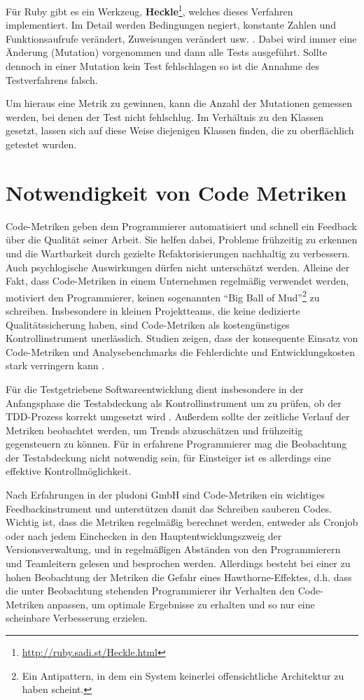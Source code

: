  Für Ruby gibt es ein Werkzeug, \textbf{Heckle}\footnote{\url{http://ruby.sadi.st/Heckle.html}}, welches dieses Verfahren implementiert. Im Detail werden Bedingungen negiert, konstante Zahlen und Funktionsaufrufe verändert, Zuweisungen verändert usw. \citep{ruby_sadists_confessions_2010}. Dabei wird immer eine Änderung (Mutation) vorgenommen und dann alle Tests ausgeführt. Sollte dennoch in einer Mutation kein Test fehlschlagen so ist die Annahme des Testverfahrens falsch.

 Um hieraus eine Metrik zu gewinnen, kann die Anzahl der Mutationen gemessen werden, bei denen der Test nicht fehlschlug. Im Verhältnis zu den Klassen gesetzt, lassen sich auf diese Weise diejenigen Klassen finden, die zu oberflächlich getestet wurden.
 \section{Notwendigkeit von Code Metriken}

 Code-Metriken geben dem Programmierer automatisiert und schnell ein Feedback über die Qualität seiner Arbeit. Sie helfen dabei, Probleme frühzeitig zu erkennen und die Wartbarkeit durch gezielte Refaktorisierungen nachhaltig zu verbessern. Auch psychlogische Auswirkungen dürfen nicht unterschätzt werden. Alleine der Fakt, dass Code-Metriken in einem Unternehmen regelmäßig verwendet werden, motiviert den Programmierer, keinen sogenannten "`Big Ball of Mud"'\footnote{Ein Antipattern, in dem ein System keinerlei offensichtliche Architektur zu haben scheint.} zu schreiben. Insbesondere in kleinen Projektteams, die keine dedizierte Qualitätssicherung haben, sind Code-Metriken als kostengünstiges Kontrollinstrument unerlässlich. Studien zeigen, dass der konsequente Einsatz von Code-Metriken und Analysebenchmarks die Fehlerdichte und Entwicklungskosten stark verringern kann \citep[S.10f]{baggen_standardized_2011}.

 Für die Testgetriebene Softwareentwicklung dient insbesondere in der Anfangsphase die Testabdeckung als Kontrollinstrument um zu prüfen, ob der TDD-Prozess korrekt umgesetzt wird \citep[S. 300]{nagappan_realizing_2008}. Außerdem sollte der zeitliche Verlauf der Metriken beobachtet werden, um Trends abzuschätzen und frühzeitig gegensteuern zu können. Für in  erfahrene Programmierer mag die Beobachtung der Testabdeckung nicht notwendig sein, für Einsteiger ist es allerdings eine effektive Kontrollmöglichkeit.

 Nach Erfahrungen in der pludoni GmbH sind Code-Metriken ein wichtiges Feedbackinstrument und unterstützen damit das Schreiben sauberen Codes. Wichtig ist, dass die Metriken regelmäßig berechnet werden, entweder als Cronjob oder nach jedem Einchecken in den Hauptentwicklungszweig der Versionsverwaltung, und in regelmäßigen Abständen von den Programmierern und Teamleitern gelesen und besprochen werden. Allerdings besteht bei einer zu hohen Beobachtung der Metriken die Gefahr eines Hawthorne-Effektes, d.h. dass die unter Beobachtung stehenden Programmierer ihr Verhalten den Code-Metriken anpassen, um optimale Ergebnisse zu erhalten \citep[52. Karte]{langr_agile_2011} und so nur eine scheinbare Verbesserung erzielen.
